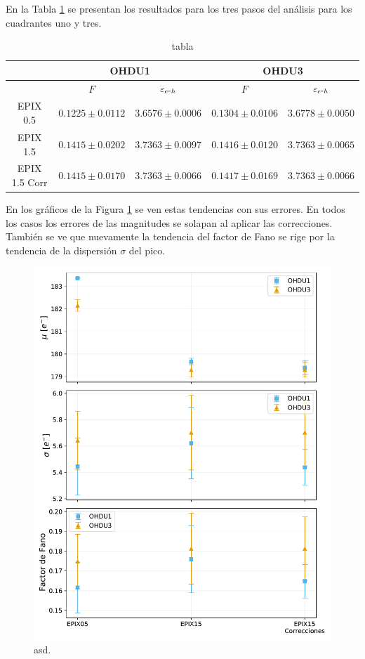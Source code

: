 En la Tabla \ref{tab:F_FanoEehOHDU1y3} se presentan los resultados para los tres pasos del análisis para los cuadrantes uno y tres.
\begin{table}[h]
\centering
\begin{tabular}{@{}ccccc@{}}
\toprule
                & \multicolumn{2}{c}{OHDU1}                 & \multicolumn{2}{c}{OHDU3}                 \\ \hline\hline
                & $F$                 & $\varepsilon_{e\mbox{-}h}$ & $F$                 & $\varepsilon_{e\mbox{-}h}$ \\
EPIX 0.5 & $0.1225 \pm 0.0112 $ & $3.6576 \pm 0.0006 $ & $0.1304 \pm 0.0106 $ & $3.6778 \pm 0.0050 $ \\ 
EPIX 1.5 & $0.1415 \pm 0.0202 $ & $3.7363 \pm 0.0097 $ & $0.1416 \pm 0.0120 $ & $3.7363 \pm 0.0065 $ \\ 
EPIX 1.5 Corr & $0.1415 \pm 0.0170 $ & $3.7363 \pm 0.0066 $ & $0.1417 \pm 0.0169 $ & $3.7363 \pm 0.0066$ \\ \bottomrule \hline
\end{tabular}
\caption{tabla}
\label{tab:F_FanoEehOHDU1y3}
\end{table}

En los gráficos de la Figura \ref{fig:F_mu_sigma_fano} se ven estas tendencias con sus errores. En todos los casos los errores de las magnitudes se solapan al aplicar las correcciones. También se ve que nuevamente la tendencia del factor de Fano se rige por la tendencia de la dispersión $\sigma$ del pico.
\begin{figure}[h]
    \centering
        \includegraphics[scale=0.5]{Figs/F_mu_sigma_fano.pdf}
    \caption{\footnotesize{asd.}}
    \label{fig:F_mu_sigma_fano}
\end{figure}

